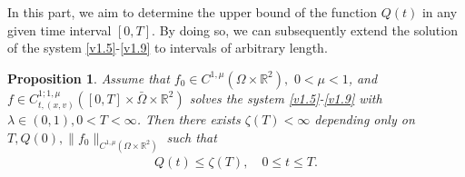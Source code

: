 \documentclass[11pt,reqno]{amsart}%
\newtheorem{Proposition}{Proposition}[section]
\theoremstyle{definition}
\theoremstyle{remark}
\begin{document}
In this part, we aim to determine the upper bound  of the function $Q(t)$ in any given time interval $[0,T]$. By doing so, we can subsequently extend the solution of the system
 \eqref{v1.5}-\eqref{v1.9} to intervals of arbitrary length.
\begin{Proposition}\label{P8}
Assume that $f_{0}\in C^{1,\mu}(\Omega\times \mathbb{R}^{2}),\,\,0<\mu<1$, and  $f\in C^{1;1,\mu}_{t,(x,v)}([0,T]\times\bar{\Omega}\times \mathbb{R}^{2})$ solves
the system \eqref{v1.5}-\eqref{v1.9} with $\lambda \in (0,1), 0< T<\infty$. Then there exists $\zeta(T)< \infty$ depending only on $T, Q(0),\|f_{0}\|_{C^{1,\mu}(\Omega\times \mathbb{R}^{2})} $ such that
\begin{align}
Q(t)\leq \zeta(T), \quad 0\leq t\leq T. \label{v6.1}
\end{align}
\end{Proposition}
\end{document}
